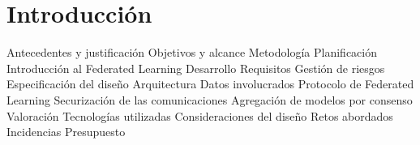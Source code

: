 \chapter{Introducción}
\thispagestyle{fancy}



Antecedentes y justificación
Objetivos y alcance
Metodología
Planificación
Introducción al Federated Learning
Desarrollo
    Requisitos
    Gestión de riesgos
    Especificación del diseño
        Arquitectura
        Datos involucrados
        Protocolo de Federated Learning
        Securización de las comunicaciones
        Agregación de modelos por consenso
        Valoración
    Tecnologías utilizadas
    Consideraciones del diseño
    Retos abordados
    Incidencias
Presupuesto
